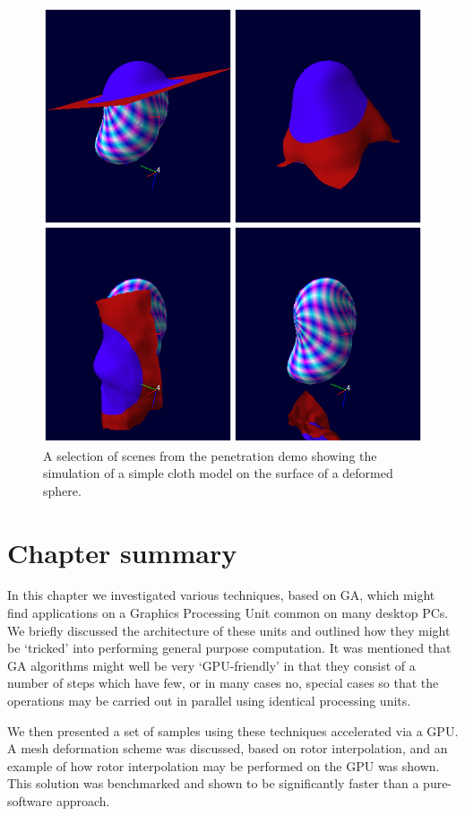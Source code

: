 \begin{figure}[p]
\centering
\includegraphics[width=\textwidth]{cloth_montage}
\caption{\label{fig:cloth_montage}%
  A selection of scenes from the penetration demo showing the
  simulation of a simple cloth model on the surface of a deformed
  sphere.
}
\end{figure}

\section{Chapter summary}

In this chapter we investigated various techniques, based on GA, which might
find applications on a Graphics Processing Unit common on many desktop PCs. We
briefly discussed the architecture of these units and outlined how they
might be `tricked' into performing general purpose computation. It was mentioned
that GA algorithms might well be very `GPU-friendly' in that they consist of
a number of steps which have few, or in many cases no, special cases so that the
operations may be carried out in parallel using identical processing units.

We then presented a set of samples using these techniques accelerated via
a GPU. A mesh deformation scheme was discussed, based on rotor interpolation, and
an example of how rotor interpolation may be performed on the GPU was shown. This
solution was benchmarked and shown to be significantly faster than a pure-software approach.

